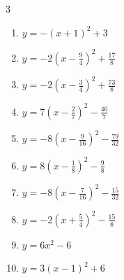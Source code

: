 \begin{multicols}{3}
\begin{enumerate}

  \item $\displaystyle y=-\left( x+1\right)^{2}+3$

        \phantom{$\displaystyle 頂点\left( -1 , 3 \right)$}

  \item $\displaystyle y=-2\left( x-\frac{9}{4}\right)^{2}+\frac{17}{8}$


  \item $\displaystyle y=-2\left( x-\frac{3}{4}\right)^{2}+\frac{73}{8}$


  \item $\displaystyle y=7\left( x-\frac{2}{7}\right)^{2}-\frac{46}{7}$


  \item $\displaystyle y=-8\left( x-\frac{9}{16}\right)^{2}-\frac{79}{32}$


  \item $\displaystyle y=8\left( x-\frac{1}{8}\right)^{2}-\frac{9}{8}$


  \item $\displaystyle y=-8\left( x-\frac{7}{16}\right)^{2}-\frac{15}{32}$


\columnbreak %

  \item $\displaystyle y=-2\left( x+\frac{5}{4}\right)^{2}-\frac{15}{8}$


  \item $\displaystyle y=6x^{2}-6$

        \phantom{$\displaystyle 頂点\left( 0 , -6 \right)$}

  \item $\displaystyle y=3\left( x-1\right)^{2}+6$


\end{enumerate}
\end{multicols}
